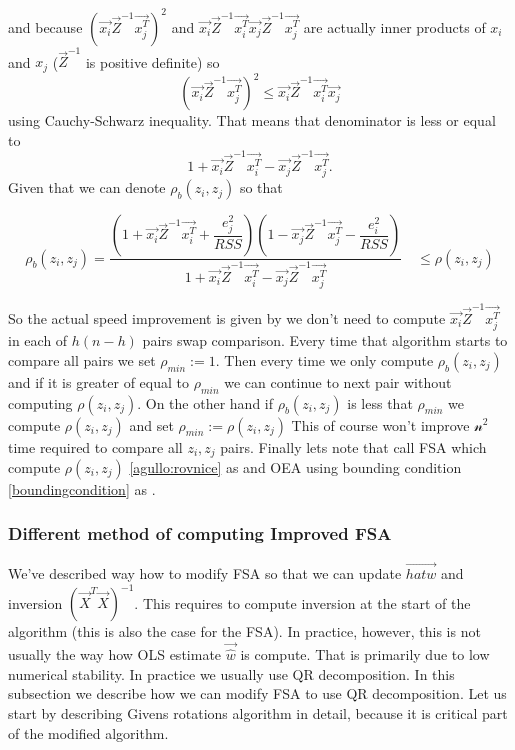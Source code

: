 and because $(\vec{x_i}\vec{Z}^{-1}\vec{x_j^T})^2$ and $\vec{x_i}\vec{Z}^{-1}\vec{x_i^T}\vec{x_j}\vec{Z}^{-1}\vec{x_j^T} $ are actually inner products of $x_i$ and $x_j$  ($\vec{Z}^{-1}$ is positive definite) so 
\begin{equation}
	(\vec{x_i}\vec{Z}^{-1}\vec{x_j^T})^2 \leq \vec{x_i}\vec{Z}^{-1}\vec{x_i^T}\vec{x_j}
\end{equation}
using Cauchy-Schwarz inequality. That means that denominator is less or equal to
\begin{equation}
	1 + \vec{x_i}\vec{Z}^{-1}\vec{x_i^T}  - \vec{x_j}\vec{Z}^{-1}\vec{x_j^T}.
\end{equation}
Given that we can denote $\rho_b(z_i, z_j)$ so that


\begin{equation} \label{boundingcondition}
	\rho_b(z_i, z_j) = \dfrac{(1+\vec{x_i}\vec{Z}^{-1}\vec{x_i^T} + \dfrac{e_j^2}{RSS})
	(1 - \vec{x_j}\vec{Z}^{-1}\vec{x_j^T} - \dfrac{e_i^2}{RSS} )}{1 + \vec{x_i}\vec{Z}^{-1}\vec{x_i^T}  - \vec{x_j}\vec{Z}^{-1}\vec{x_j^T}} \quad \leq \rho(z_i, z_j)
\end{equation}

So the actual speed improvement is given by we don't need to compute $\vec{x_i}\vec{Z}^{-1}\vec{x_j^T}$ in each of $h(n-h)$ pairs swap comparison. Every time that algorithm starts to compare all pairs we set $\rho_{min} :=1$. Then every time we only compute $\rho_b(z_i, z_j)$ and if it is greater of equal to $\rho_{min}$ we can continue to next pair without computing $\rho(z_i, z_j)$. On the other hand if $\rho_b(z_i, z_j)$ is less that  $\rho_{min}$ we compute $\rho(z_i, z_j)$ and set $\rho_{min} := \rho(z_i, z_j)$ This of course won't improve $\mathcal{n^2}$ time required to compare all $z_i, z_j$ pairs.
Finally lets note that \cite{agullo2001new} call FSA  which compute $\rho(z_i, z_j)$  \ref{agullo:rovnice} as  and OEA using bounding condition \ref{boundingcondition} as  .




\subsubsection*{Different method of computing Improved FSA}

We've described way how to modify FSA so that we can update $\vec{hat{w}}$ and inversion $(\vec{X}^T \vec{X})^{-1}$. This requires to compute inversion at the start of the algorithm (this is also the case for the FSA). In practice, however, this is not usually the way how OLS estimate $\vec{\hat{w}}$ is compute. That is primarily due to low numerical stability. In practice we usually use QR decomposition. In this subsection we describe how we can modify FSA to use QR decomposition. Let us start by describing Givens rotations algorithm in detail, because it is critical part of the modified algorithm. 

